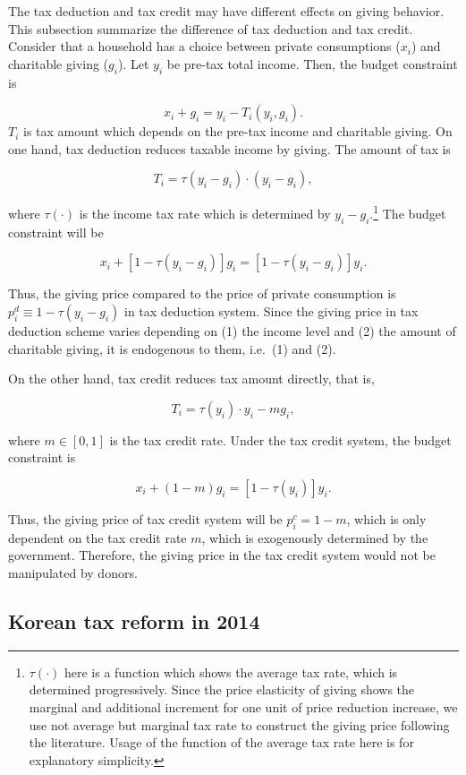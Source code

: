 \documentclass[ review  , 3p ]{elsarticle}
\begin{document}
  The tax deduction and tax credit may have different effects on giving behavior. This subsection summarize the difference of tax deduction and tax credit.
  Consider that a household has a choice between private consumptions (\(x_i\)) and charitable giving (\(g_i\)). Let \(y_i\) be pre-tax total income.
  Then, the budget constraint is

  \[
      x_i + g_i = y_i - T_i(y_i, g_i).
  \]
  \(T_i\) is tax amount which depends on the pre-tax income and charitable giving.
  On one hand, tax deduction reduces taxable income by giving. The amount of tax is

  \[
      T_i = \tau(y_i - g_i) \cdot (y_i - g_i),
  \]

  where \(\tau(\cdot)\) is the income tax rate which is determined by \(y_i - g_i\).\footnote{\(\tau(\cdot)\) here is a function which shows the average tax rate, which is determined progressively. Since the price elasticity of giving shows the marginal and additional increment for one unit of price reduction increase, we use not average but marginal tax rate to construct the giving price following the literature. Usage of the function of the average tax rate here is for explanatory simplicity.} The budget constraint will be

  \[
      x_i + [1 - \tau(y_i - g_i)]g_i = [1 - \tau(y_i - g_i)] y_i.
  \]

  Thus, the giving price compared to the price of private consumption is \(p_i^{d} \equiv 1 - \tau(y_i - g_i)\) in tax deduction system. Since the giving price in tax deduction scheme varies depending on (1) the income level and (2) the amount of charitable giving, it is endogenous to them, i.e.~(1) and (2).

  On the other hand, tax credit reduces tax amount directly, that is,

  \[
      T_i = \tau(y_i)\cdot y_i - m g_i,
  \]

  where \(m \in [0, 1]\) is the tax credit rate. Under the tax credit system, the budget constraint is

  \[
      x_i + (1 - m) g_i = [1 - \tau(y_i)] y_i.
  \]

  Thus, the giving price of tax credit system will be \(p_i^c = 1 - m\), which is only dependent on the tax credit rate \(m\), which is exogenously determined by the government.
  Therefore, the giving price in the tax credit system would not be manipulated by donors.

  \hypertarget{korean-tax-reform-in-2014}{%
  \subsection{Korean tax reform in 2014}\label{korean-tax-reform-in-2014}}
\end{document}
